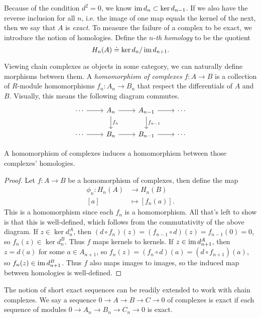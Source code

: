 \documentclass[twoside,10pt]{article}
\begin{document}
Because of the condition $d^2=0$, we know $\operatorname{im} d_n \subset \ker d_{n-1}$. If we also have the reverse inclusion for all $n$, i.e. the image of one map equals the kernel of the next, then we say that $A$ is \textit{exact}. To measure the failure of a complex to be exact, we introduce the notion of homologies. Define the $n$\textit{-th homology} to be the quotient
\[
	H_{n}(A) \doteq \ker d_n / \operatorname{im} d_{n+1}.
\] 

Viewing chain complexes as objects in some category, we can naturally define morphisms between them. A \textit{homomorphism of complexes} $f:A\to B$ is a collection of $R$-module homomorphisms $f_{n}:A_{n}\to B_{n}$ that respect the differentials of $A$ and $B$. Visually, this means the following diagram commutes.
\[
	\begin{tikzcd}
		\cdots \arrow[r] & A_n \arrow[r]\arrow[d,"f_n"] & A_{n-1} \arrow[r] \arrow[d,"f_{n-1}"]& \cdots \\
		\cdots \arrow[r] & B_n \arrow[r] & B_{n-1} \arrow[r] & \cdots
	\end{tikzcd}
\]

\begin{prop}
	\label{prop:induced-homo}
A homomorphism of complexes induces a homomorphism between those complexes' homologies.
\end{prop}
\begin{proof}
	Let $f:A\to B$ be a homomorphism of complexes, then define the map
	\begin{align*}
		\phi_n:H_{n}(A)&\to H_{n}(B)\\
		[a]&\mapsto [f_n(a)].
	\end{align*}
	This is a homomorphism since each $f_{n}$ is a homomorphism. All that's left to show is that this is well-defined, which follows from the commutativity of the above diagram. If $z \in \ker d_{n}^A$, then $(d \circ f_{n})(z) = (f_{n-1} \circ d)(z) = f_{n-1}(0) = 0$, so $f_{n}(z) \in \ker d_{n}^{B}$. Thus $f$ maps kernels to kernels. If $z \in \operatorname{im} d_{n+1}^{A}$, then $z=d(a)$ for some $a \in A_{n+1}$, so $f_{n}(z)=(f_{n}\circ d)(a) = (d\circ f_{n+1})(a)$, so $f_{n}(z) \in \operatorname{im} d_{n+1}^{B}$. Thus $f$ also maps images to images, so the induced map between homologies is well-defined.
\end{proof}

The notion of short exact sequences can be readily extended to work with chain complexes. We say a sequence $0\to A\to B\to C \to 0$ of complexes is exact if each sequence of modules $0 \to A_{n}\to B_{n}\to C_{n} \to 0$ is exact.
\end{document}
